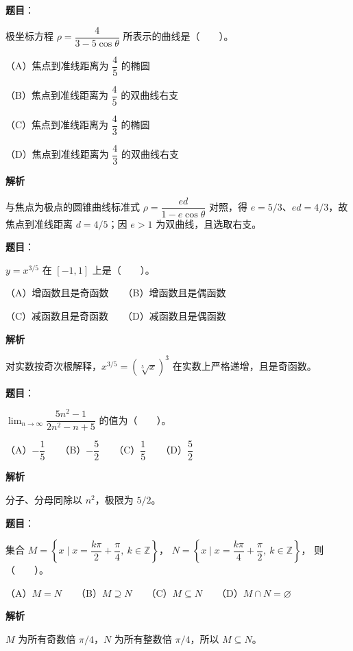 \begin{answer}

\textbf{题目}：

极坐标方程 $\rho=\dfrac4{3-5\cos\theta}$ 所表示的曲线是\mbox{（　　）}。

（A）焦点到准线距离为 $\dfrac45$ 的椭圆

（B）焦点到准线距离为 $\dfrac45$ 的双曲线右支

（C）焦点到准线距离为 $\dfrac43$ 的椭圆

（D）焦点到准线距离为 $\dfrac43$ 的双曲线右支

\textbf{解析}

与焦点为极点的圆锥曲线标准式
$\rho=\dfrac{ed}{1-e\cos\theta}$ 对照，得 $e=5/3$、$ed=4/3$，故焦点到准线距离 $d=4/5$；因 $e>1$ 为双曲线，且选取右支。


\end{answer}
\begin{answer}

\textbf{题目}：

$y=x^{3/5}$ 在 $[-1,1]$ 上是\mbox{（　　）}。

（A）增函数且是奇函数　　（B）增函数且是偶函数

（C）减函数且是奇函数　　（D）减函数且是偶函数

\textbf{解析}

对实数按奇次根解释，$x^{3/5}=(\sqrt[5]x)^3$ 在实数上严格递增，且是奇函数。


\end{answer}
\begin{answer}

\textbf{题目}：

$\displaystyle\lim_{n\to\infty}\dfrac{5n^2-1}{2n^2-n+5}$ 的值为\mbox{（　　）}。

（A）$-\dfrac15$　　（B）$-\dfrac52$　　（C）$\dfrac15$　　（D）$\dfrac52$

\textbf{解析}

分子、分母同除以 $n^2$，极限为 $5/2$。


\end{answer}
\begin{answer}

\textbf{题目}：

集合
$M=\left\{x\mid x=\dfrac{k\pi}{2}+\dfrac\pi4,\ k\in\mathbb Z\right\}$，
$N=\left\{x\mid x=\dfrac{k\pi}{4}+\dfrac\pi2,\ k\in\mathbb Z\right\}$，
则\mbox{（　　）}。

（A）$M=N$　　（B）$M\supseteq N$　　（C）$M\subseteq N$　　（D）$M\cap N=\varnothing$

\textbf{解析}

$M$ 为所有奇数倍 $\pi/4$，$N$ 为所有整数倍 $\pi/4$，所以 $M\subseteq N$。


\end{answer}
